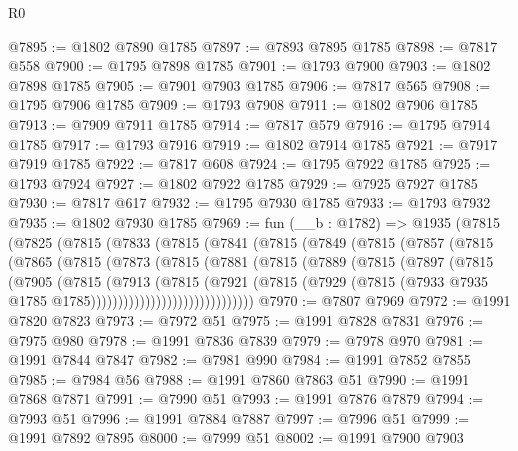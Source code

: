 \begin{lexlean}{R0}
\begin{coremodule}
@7895 := @1802 @7890 @1785
@7897 := @7893 @7895 @1785
@7898 := @7817 @558
@7900 := @1795 @7898 @1785
@7901 := @1793 @7900
@7903 := @1802 @7898 @1785
@7905 := @7901 @7903 @1785
@7906 := @7817 @565
@7908 := @1795 @7906 @1785
@7909 := @1793 @7908
@7911 := @1802 @7906 @1785
@7913 := @7909 @7911 @1785
@7914 := @7817 @579
@7916 := @1795 @7914 @1785
@7917 := @1793 @7916
@7919 := @1802 @7914 @1785
@7921 := @7917 @7919 @1785
@7922 := @7817 @608
@7924 := @1795 @7922 @1785
@7925 := @1793 @7924
@7927 := @1802 @7922 @1785
@7929 := @7925 @7927 @1785
@7930 := @7817 @617
@7932 := @1795 @7930 @1785
@7933 := @1793 @7932
@7935 := @1802 @7930 @1785
@7969 := fun (__b : @1782) =>
  @1935
    (@7815
      (@7825
        (@7815
          (@7833
            (@7815
              (@7841
                (@7815
                  (@7849
                    (@7815
                      (@7857
                        (@7815
                          (@7865
                            (@7815
                              (@7873
                                (@7815
                                  (@7881
                                    (@7815
                                      (@7889
                                        (@7815
                                          (@7897
                                            (@7815
                                              (@7905
                                                (@7815
                                                  (@7913
                                                    (@7815
                                                      (@7921
                                                        (@7815
                                                          (@7929
                                                            (@7815
                                                              (@7933
                                                                @7935
                                                                @1785
                                                                @1785))))))))))))))))))))))))))))))
@7970 := @7807 @7969
@7972 := @1991 @7820 @7823
@7973 := @7972 @51
@7975 := @1991 @7828 @7831
@7976 := @7975 @980
@7978 := @1991 @7836 @7839
@7979 := @7978 @970
@7981 := @1991 @7844 @7847
@7982 := @7981 @990
@7984 := @1991 @7852 @7855
@7985 := @7984 @56
@7988 := @1991 @7860 @7863 @51
@7990 := @1991 @7868 @7871
@7991 := @7990 @51
@7993 := @1991 @7876 @7879
@7994 := @7993 @51
@7996 := @1991 @7884 @7887
@7997 := @7996 @51
@7999 := @1991 @7892 @7895
@8000 := @7999 @51
@8002 := @1991 @7900 @7903

\end{coremodule}
\end{lexlean}
